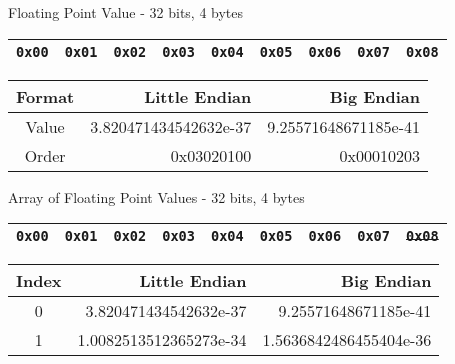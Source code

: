\documentclass{beamer}
\begin{document}
\begin{frame}{Floating Point Value - 32 bits, 4 bytes}

\begin{table}[]
\begin{tabular}{|l|l|l|l|l|l|l|l|l|}
\hline
 \color{red}\texttt{0x00} & \color{red}\texttt{0x01} & \color{red}\texttt{0x02} & \color{red}\texttt{0x03} & \texttt{0x04} & \texttt{0x05} & \texttt{0x06} & \texttt{0x07} &
 \texttt{0x08} \\
\hline 
\end{tabular}
\end{table}

\begin{table}[]
\begin{tabular}{c r r}
Format & Little Endian & Big Endian \\
\hline
Value &  3.820471434542632e-37   & 9.25571648671185e-41 \\
Order & 0x03020100 & 0x00010203
\end{tabular}
\end{table}

\end{frame}

\begin{frame}{Array of Floating Point Values - 32 bits, 4 bytes}

\begin{table}[]
\begin{tabular}{|l|l|l|l|l|l|l|l|l|}
\hline
 \color{red}\texttt{0x00} & \color{red}\texttt{0x01} & \color{red}\texttt{0x02} & \color{red}\texttt{0x03} & \color{blue}\texttt{0x04} & \color{blue}\texttt{0x05} & \color{blue}\texttt{0x06} & \color{blue}\texttt{0x07} &
 \sout{\texttt{0x08}} \\
\hline 
\end{tabular}
\end{table}

\begin{table}[]
\begin{tabular}{c r r}
Index & Little Endian & Big Endian \\
\hline
0 &  3.820471434542632e-37   & 9.25571648671185e-41 \\
1 & 1.0082513512365273e-34 & 1.5636842486455404e-36
\end{tabular}
\end{table}

\end{frame}
\end{document}
